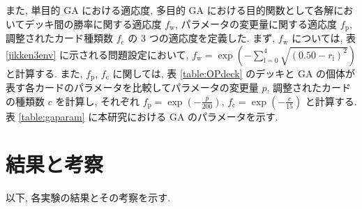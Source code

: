 \documentclass[twocolumn]{jarticle}     %
\begin{document}
また, 単目的 GA における適応度, 多目的 GA における目的関数として各解においてデッキ間の勝率に関する適応度 $f_\mathrm{w}$,  パラメータの変更量に関する適応度 $f_\mathrm{p}$, 調整されたカード種類数 $f_\mathrm{c}$ の 3 つの適応度を定義した.
まず, $f_\mathrm{w}$ については, 表 \ref{jikken3env} に示される問題設定において, $f_\mathrm{w} = \exp(-\sum_{\mathrm{i}=0}^4 \sqrt{(0.50 - r_\mathrm{i})^2})$ と計算する.
また, $f_\mathrm{p}$, $f_\mathrm{c}$ に関しては, 表 \ref{table:OPdeck} のデッキと GA の個体が表す各カードのパラメータを比較してパラメータの変更量 $p$, 調整されたカードの種類数 $c$ を計算し, それぞれ $f_\mathrm{p} = \exp(-\frac{p}{200})$, $f_\mathrm{c} = \exp(-\frac{c}{15})$ と計算する.
表 \ref{table:gaparam} に本研究における GA のパラメータを示す.

     \section{結果と考察}
     以下, 各実験の結果とその考察を示す.
     
\end{document}
